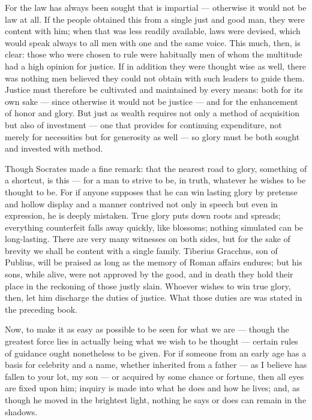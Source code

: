  For the law has always been sought that is impartial — otherwise it would not be law at all. If the people obtained this from a single just and good man, they were content with him; when that was less readily available, laws were devised, which would speak always to all men with one and the same voice. This much, then, is clear: those who were chosen to rule were habitually men of whom the multitude had a high opinion for justice. If in addition they were thought wise as well, there was nothing men believed they could not obtain with such leaders to guide them. Justice must therefore be cultivated and maintained by every means: both for its own sake — since otherwise it would not be justice — and for the enhancement of honor and glory. But just as wealth requires not only a method of acquisition but also of investment — one that provides for continuing expenditure, not merely for necessities but for generosity as well — so glory must be both sought and invested with method.

 Though Socrates made a fine remark: that the nearest road to glory, something of a shortcut, is this — for a man to strive to be, in truth, whatever he wishes to be thought to be. For if anyone supposes that he can win lasting glory by pretense and hollow display and a manner contrived not only in speech but even in expression, he is deeply mistaken. True glory puts down roots and spreads; everything counterfeit falls away quickly, like blossoms; nothing simulated can be long-lasting. There are very many witnesses on both sides, but for the sake of brevity we shall be content with a single family. Tiberius Gracchus, son of Publius, will be praised as long as the memory of Roman affairs endures; but his sons, while alive, were not approved by the good, and in death they hold their place in the reckoning of those justly slain. Whoever wishes to win true glory, then, let him discharge the duties of justice. What those duties are was stated in the preceding book.

 Now, to make it as easy as possible to be seen for what we are — though the greatest force lies in actually being what we wish to be thought — certain rules of guidance ought nonetheless to be given. For if someone from an early age has a basis for celebrity and a name, whether inherited from a father — as I believe has fallen to your lot, my son — or acquired by some chance or fortune, then all eyes are fixed upon him; inquiry is made into what he does and how he lives; and, as though he moved in the brightest light, nothing he says or does can remain in the shadows.

